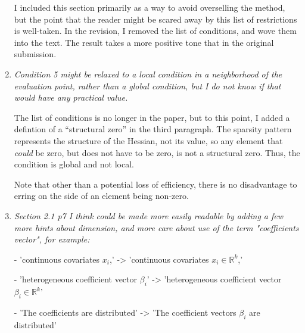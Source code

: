 \documentclass{article}
\newcommand{\Real}[1]{\mathbb{R}^{#1}}
\newenvironment{revQuote}{\itshape}{\vspace{\baselineskip}}
\newenvironment{response}{\normalfont}{\vspace{\baselineskip}}
\begin{document}
\begin{enumerate}
\begin{revQuote}
  \end{revQuote}

  \begin{response}

I included this section primarily as a way to avoid overselling the
method, but the point that the reader might be scared away by this list of
restrictions is well-taken.  In the revision, I removed the list of
conditions, and wove them into the text.  The result takes a more
positive tone that in the original submission.

\end{response}

\item \begin{revQuote}
Condition 5 might be relaxed to a local condition in a neighborhood of
the evaluation point, rather than a global condition, but I do not know if
that would have any practical value.
  \end{revQuote}

\begin{response}

  The list of conditions is no longer in the paper, but to this point,
  I added a defintion of a ``structural zero'' in the third
  paragraph. The sparsity pattern represents the structure of the
  Hessian, not its value, so any element that \emph{could} be zero,
  but does not have to be zero, is not a structural zero.  Thus, the
  condition is global and not local.

  Note that other than
  a potential loss of efficiency, there is no disadvantage to erring
  on the side of an element being non-zero.  
\end{response}

\item \begin{revQuote}
Section 2.1 p7 I think could be made more easily readable by adding a few
more hints about dimension, and more care about use of the term 
"coefficients vector", for example:

  - 'continuous covariates $x_i$,' -> 'continuous covariates $x_i \in
\Real{k}$,'

  - 'heterogeneous coefficient vector $\beta_i$' -> 'heterogeneous
coefficient vector $\beta_i \in \Real{k}$'

  - 'The coefficients are distributed' -> 'The coefficient vectors
$\beta_i$ are distributed'

  \end{revQuote}


\end{enumerate}
\end{document}
